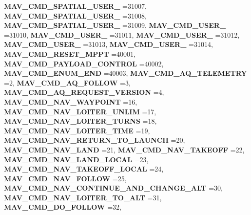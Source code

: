 \begin{DoxyCompactItemize}
\textbf{ M\+A\+V\+\_\+\+C\+M\+D\+\_\+\+S\+P\+A\+T\+I\+A\+L\+\_\+\+U\+S\+E\+R\+\_} =31007, 
\textbf{ M\+A\+V\+\_\+\+C\+M\+D\+\_\+\+S\+P\+A\+T\+I\+A\+L\+\_\+\+U\+S\+E\+R\+\_} =31008, 
\newline
\textbf{ M\+A\+V\+\_\+\+C\+M\+D\+\_\+\+S\+P\+A\+T\+I\+A\+L\+\_\+\+U\+S\+E\+R\+\_} =31009, 
\textbf{ M\+A\+V\+\_\+\+C\+M\+D\+\_\+\+U\+S\+E\+R\+\_} =31010, 
\textbf{ M\+A\+V\+\_\+\+C\+M\+D\+\_\+\+U\+S\+E\+R\+\_} =31011, 
\textbf{ M\+A\+V\+\_\+\+C\+M\+D\+\_\+\+U\+S\+E\+R\+\_} =31012, 
\newline
\textbf{ M\+A\+V\+\_\+\+C\+M\+D\+\_\+\+U\+S\+E\+R\+\_} =31013, 
\textbf{ M\+A\+V\+\_\+\+C\+M\+D\+\_\+\+U\+S\+E\+R\+\_} =31014, 
\textbf{ M\+A\+V\+\_\+\+C\+M\+D\+\_\+\+R\+E\+S\+E\+T\+\_\+\+M\+P\+PT} =40001, 
\textbf{ M\+A\+V\+\_\+\+C\+M\+D\+\_\+\+P\+A\+Y\+L\+O\+A\+D\+\_\+\+C\+O\+N\+T\+R\+OL} =40002, 
\newline
\textbf{ M\+A\+V\+\_\+\+C\+M\+D\+\_\+\+E\+N\+U\+M\+\_\+\+E\+ND} =40003, 
\textbf{ M\+A\+V\+\_\+\+C\+M\+D\+\_\+\+A\+Q\+\_\+\+T\+E\+L\+E\+M\+E\+T\+RY} =2, 
\textbf{ M\+A\+V\+\_\+\+C\+M\+D\+\_\+\+A\+Q\+\_\+\+F\+O\+L\+L\+OW} =3, 
\textbf{ M\+A\+V\+\_\+\+C\+M\+D\+\_\+\+A\+Q\+\_\+\+R\+E\+Q\+U\+E\+S\+T\+\_\+\+V\+E\+R\+S\+I\+ON} =4, 
\newline
\textbf{ M\+A\+V\+\_\+\+C\+M\+D\+\_\+\+N\+A\+V\+\_\+\+W\+A\+Y\+P\+O\+I\+NT} =16, 
\textbf{ M\+A\+V\+\_\+\+C\+M\+D\+\_\+\+N\+A\+V\+\_\+\+L\+O\+I\+T\+E\+R\+\_\+\+U\+N\+L\+IM} =17, 
\textbf{ M\+A\+V\+\_\+\+C\+M\+D\+\_\+\+N\+A\+V\+\_\+\+L\+O\+I\+T\+E\+R\+\_\+\+T\+U\+R\+NS} =18, 
\textbf{ M\+A\+V\+\_\+\+C\+M\+D\+\_\+\+N\+A\+V\+\_\+\+L\+O\+I\+T\+E\+R\+\_\+\+T\+I\+ME} =19, 
\newline
\textbf{ M\+A\+V\+\_\+\+C\+M\+D\+\_\+\+N\+A\+V\+\_\+\+R\+E\+T\+U\+R\+N\+\_\+\+T\+O\+\_\+\+L\+A\+U\+N\+CH} =20, 
\textbf{ M\+A\+V\+\_\+\+C\+M\+D\+\_\+\+N\+A\+V\+\_\+\+L\+A\+ND} =21, 
\textbf{ M\+A\+V\+\_\+\+C\+M\+D\+\_\+\+N\+A\+V\+\_\+\+T\+A\+K\+E\+O\+FF} =22, 
\textbf{ M\+A\+V\+\_\+\+C\+M\+D\+\_\+\+N\+A\+V\+\_\+\+L\+A\+N\+D\+\_\+\+L\+O\+C\+AL} =23, 
\newline
\textbf{ M\+A\+V\+\_\+\+C\+M\+D\+\_\+\+N\+A\+V\+\_\+\+T\+A\+K\+E\+O\+F\+F\+\_\+\+L\+O\+C\+AL} =24, 
\textbf{ M\+A\+V\+\_\+\+C\+M\+D\+\_\+\+N\+A\+V\+\_\+\+F\+O\+L\+L\+OW} =25, 
\textbf{ M\+A\+V\+\_\+\+C\+M\+D\+\_\+\+N\+A\+V\+\_\+\+C\+O\+N\+T\+I\+N\+U\+E\+\_\+\+A\+N\+D\+\_\+\+C\+H\+A\+N\+G\+E\+\_\+\+A\+LT} =30, 
\textbf{ M\+A\+V\+\_\+\+C\+M\+D\+\_\+\+N\+A\+V\+\_\+\+L\+O\+I\+T\+E\+R\+\_\+\+T\+O\+\_\+\+A\+LT} =31, 
\newline
\textbf{ M\+A\+V\+\_\+\+C\+M\+D\+\_\+\+D\+O\+\_\+\+F\+O\+L\+L\+OW} =32, 

\end{DoxyCompactItemize}
